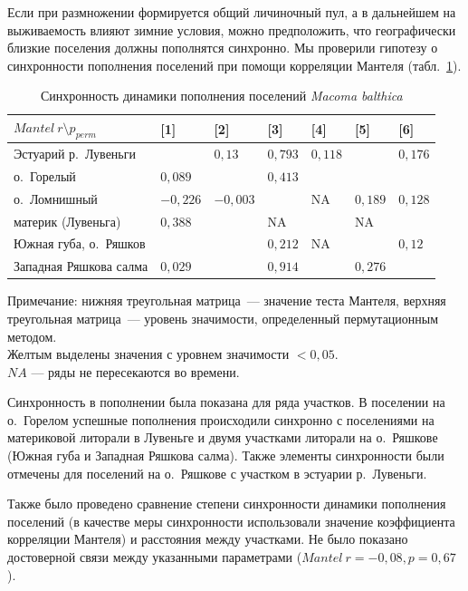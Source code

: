 Если при размножении формируется общий личиночный пул, а в дальнейшем на выживаемость влияют зимние условия, можно предположить, что географически близкие поселения должны пополнятся синхронно.
Мы проверили гипотезу о синхронности пополнения поселений при помощи корреляции Мантеля (табл.~\ref{tab:Mantel_dynamic_N1y}).
	\begin{table}[p]
	\caption{Синхронность динамики пополнения поселений {\it Macoma balthica}}
	\label{tab:Mantel_dynamic_N1y}
        \begin{tabularx}{\textwidth}{|p{}|*{6}{X|}} 
	\hline
	$Mantel \ r \setminus p_{perm}$ & [1] & [2] & [3] & [4] & [5] & [6] \\ \hline
	[1] Эстуарий р.~Лувеньги             &         & $0,13$    & $0,793$      & $0,118$   & \cellcolor{yellow}{$0,001$} & $0,176$ \\ \hline
	[2] о.~Горелый             & $0,089$   &         & $0,413$      & \cellcolor{yellow}{$0,009$}   & \cellcolor{yellow}{$0,004$} & \cellcolor{yellow}{$0,001$} \\ \hline
	[3] о.~Ломнишный          & $-0,226$  & $-0,003$  &            & NA      & $0,189$ & $0,128$ \\ \hline
	[4] материк (Лувеньга)             & $0,388$   & \cellcolor{yellow}{$0,955$}   & NA         &         & NA    & \cellcolor{yellow}{$0,02$}  \\ \hline
	[5] Южная губа, о.~Ряшков                 & \cellcolor{yellow}{$0,793$}   & \cellcolor{yellow}{$0,515$}   & $0,212$      & NA      &       & $0,12$  \\ \hline
	[6] Западная Ряшкова салма                 & $0,029$   & \cellcolor{yellow}{$0,986$}   & $0,914$      & \cellcolor{yellow}{$0,965$}   & $0,276$ &       \\ \hline 
	\end{tabularx}
	   {\footnotesize Примечание: нижняя треугольная матрица~--- значение теста Мантеля, верхняя треугольная матрица~--- уровень значимости, определенный пермутационным методом. \\
	Желтым выделены значения с уровнем значимости $< 0,05$. \\
	$NA$ --- ряды не пересекаются во времени.}
	\end{table}
Синхронность в пополнении была показана для ряда участков.
В поселении на о.~Горелом успешные пополнения происходили синхронно с поселениями на материковой литорали в Лувеньге и двумя участками литорали на о.~Ряшкове (Южная губа и Западная Ряшкова салма).
Также элементы синхронности были отмечены для поселений на о.~Ряшкове с участком в эстуарии р.~Лувеньги.

Также было проведено сравнение степени синхронности динамики пополнения поселений (в качестве меры синхронности использовали значение коэффициента корреляции Мантеля) и расстояния между участками.
Не было показано достоверной связи между указанными параметрами ($Mantel\ r = -0,08, p = 0,67$ ).

